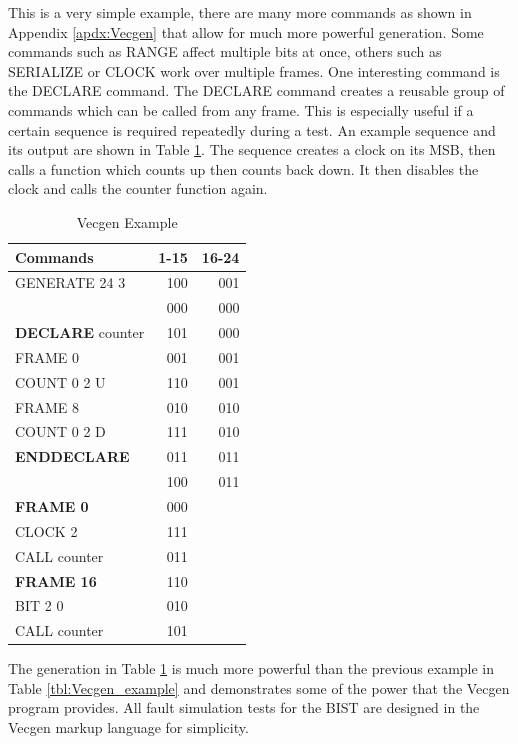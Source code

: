\documentclass[12pt]{report}
\begin{document}
This is a very simple example, there are many more commands as shown in Appendix \ref{apdx:Vecgen} that allow for much more powerful generation.  Some commands such as RANGE affect multiple bits at once, others such as SERIALIZE or CLOCK work over multiple frames.  One interesting command is the DECLARE command.  The DECLARE command creates a reusable group of commands which can be called from any frame.  This is especially useful if a certain sequence is required repeatedly during a test.  An example sequence and its output are shown in Table \ref{tbl:countsequence}.  The sequence creates a clock on its MSB, then calls a function which counts up then counts back down.  It then disables the clock and calls the counter function again.
\begin{table}
	\begin{center}
		\begin{tabular}{l|r|r}
		Commands & 1-15 & 16-24 \\ \hline
		GENERATE 24 3 & 100 & 001 \\
		 & 000 & 000 \\
		\textbf{DECLARE} counter & 101 & 000 \\
		FRAME 0	& 001 & 001 \\
		COUNT 0 2 U & 110 & 001 \\
		FRAME 8 & 010 & 010 \\
		COUNT 0 2 D & 111 & 010 \\
		\textbf{ENDDECLARE} & 011 & 011 \\ 
		 & 100 & 011 \\
 		\textbf{FRAME 0} & 000 & \\
		CLOCK 2 & 111 &  \\
		CALL counter & 011 & \\
		\textbf{FRAME 16} & 110 & \\
		BIT 2 0 & 010 &  \\
		CALL counter & 101 & \\
		\end{tabular}
	\end{center}
	\caption{Vecgen Example}
	\label{tbl:countsequence}
\end{table}
The generation in Table \ref{tbl:countsequence} is much more powerful than the previous example in Table \ref{tbl:Vecgen_example} and demonstrates some of the power that the Vecgen program provides.  All fault simulation tests for the BIST are designed in the Vecgen markup language for simplicity.
\end{document}
